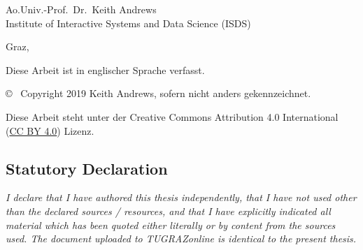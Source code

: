 \begin{otherlanguage}{austrian}
\begin{center}
{\normalsize\sffamily
Ao.Univ.-Prof.\ Dr.\ Keith Andrews \\
Institute of Interactive Systems and Data Science (ISDS)
}


\vspace{1cm}

{\normalsize\sffamily Graz, \thisdate}


\vspace{1cm}

{\small Diese Arbeit ist in englischer Sprache verfasst.}



\vfill

{\footnotesize\sffamily \copyright ~ Copyright 2019 Keith Andrews, sofern
nicht anders gekennzeichnet.}

{\footnotesize\sffamily Diese Arbeit steht unter der Creative Commons
Attribution 4.0 International
(\href{https://creativecommons.org/licenses/by/4.0/}{CC BY 4.0})
Lizenz.}

\end{center}

\end{otherlanguage}







\cleardoublepage

\vspace*{2cm}







\subsection*{Statutory Declaration}
\noindent
\textit{
I declare that I have authored this thesis independently, that I have
not used other than the declared sources / resources, and that I have
explicitly indicated all material which has been quoted either
literally or by content from the sources used. The document uploaded
to TUGRAZonline is identical to the present thesis.}

